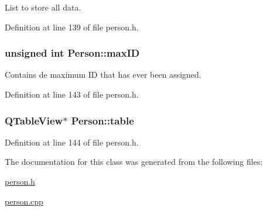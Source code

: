 List to store all data. 



Definition at line 139 of file person.\+h.

\hypertarget{class_person_a816ee6194426eb703b61ae267e8e8ee6}{
\subsubsection[{max\+I\+D}]{\setlength{\rightskip}{0pt plus 5cm}unsigned int Person\+::max\+I\+D\hspace{0.3cm}{\ttfamily [private]}}}\label{class_person_a816ee6194426eb703b61ae267e8e8ee6}


Contains de maximum I\+D that has ever been assigned. 



Definition at line 143 of file person.\+h.

\hypertarget{class_person_aefba04c96d0d90ab2b220e6ad704c55a}{
\subsubsection[{table}]{\setlength{\rightskip}{0pt plus 5cm}Q\+Table\+View$\ast$ Person\+::table\hspace{0.3cm}{\ttfamily [private]}}}\label{class_person_aefba04c96d0d90ab2b220e6ad704c55a}


Definition at line 144 of file person.\+h.



The documentation for this class was generated from the following files\+:\begin{DoxyCompactItemize}
\item 
\hyperlink{person_8h}{person.\+h}\item 
\hyperlink{person_8cpp}{person.\+cpp}\end{DoxyCompactItemize}
